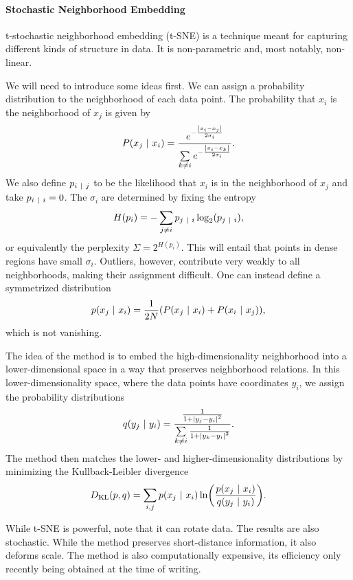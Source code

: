 \paragraph{Stochastic Neighborhood Embedding}
t-stochastic neighborhood embedding (t-SNE) is a technique meant for capturing different kinds of structure in data. It is non-parametric and, most notably, non-linear.

We will need to introduce some ideas first. We can assign a probability distribution to the neighborhood of each data point. The probability that $x_{i}$ is the neighborhood of $x_{j}$ is given by
\begin{align*}
	P(x_{j}\ \vert\  x_{i}) = \frac{e^{-\frac{\abs{x_{i} - x_{j}}}{2\sigma_{i}}}}{\sum\limits_{k\neq i}e^{-\frac{\abs{x_{i} - x_{k}}}{2\sigma_{i}}}}.
\end{align*}
We also define $p_{i\ \vert\  j}$ to be the likelihood that $x_{i}$ is in the neighborhood of $x_{j}$ and take $p_{i\ \vert\  i} = 0$. The $\sigma_{i}$ are determined by fixing the entropy
\begin{align*}
	H(p_{i}) = -\sum\limits_{j\neq i}p_{j\ \vert\  i}\log_{2}(p_{j\ \vert\  i}),
\end{align*}
or equivalently the perplexity $\Sigma = 2^{H(p_{i})}$. This will entail that points in dense regions have small $\sigma_{i}$. Outliers, however, contribute very weakly to all neighborhoods, making their assignment difficult. One can instead define a symmetrized distribution
\begin{align*}
	p(x_{j}\ \vert\  x_{i}) = \frac{1}{2N}(P(x_{j}\ \vert\  x_{i}) + P(x_{i}\ \vert\  x_{j})),
\end{align*}
which is not vanishing.

The idea of the method is to embed the high-dimensionality neighborhood into a lower-dimensional space in a way that preserves neighborhood relations. In this lower-dimensionality space, where the data points have coordinates $y_{i}$, we assign the probability distributions
\begin{align*}
	q(y_{j}\ \vert\  y_{i}) = \frac{\frac{1}{1 + \abs{y_{j} - y_{i}}^{2}}}{\sum\limits_{k\neq i}\frac{1}{1 + \abs{y_{k} - y_{i}}^{2}}}.
\end{align*}
The method then matches the lower- and higher-dimensionality distributions by minimizing the Kullback-Leibler divergence
\begin{align*}
	D_{\text{KL}}(p, q) = \sum\limits_{i, j}p(x_{j}\ \vert\  x_{i})\ln(\frac{p(x_{j}\ \vert\  x_{i})}{q(y_{j}\ \vert\  y_{i})}).
\end{align*}

While t-SNE is powerful, note that it can rotate data. The results are also stochastic. While the method preserves short-distance information, it also deforms scale. The method is also computationally expensive, its efficiency only recently being obtained at the time of writing.